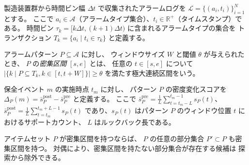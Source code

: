 
\begin{definition}[アラームトランザクション]
製造装置群から時間ビン幅 $\Delta t$ で収集されたアラームログを
$\mathcal{L} = \{(a_i, t_i)\}_{i=1}^{N}$ とする。
ここで $a_i \in \mathcal{A}$（アラームタイプ集合）、$t_i \in \mathbb{R}^+$（タイムスタンプ）である。
時間ビン $\tau_k = [k\Delta t, (k+1)\Delta t)$ に含まれるアラームタイプの集合を
トランザクション $T_k = \{a_i \mid t_i \in \tau_k\}$ と定義する。
\end{definition}

\begin{definition}[アラームパターンの密集区間]
アラームパターン $P \subseteq \mathcal{A}$ に対し、
ウィンドウサイズ $W$ と閾値 $\theta$ が与えられたとき、
$P$ の\emph{密集区間} $[s, e]$ とは、
任意の $t \in [s, e]$ について
$|\{k \mid P \subseteq T_k, k \in [t, t+W]\}| \geq \theta$
を満たす極大連続区間をいう。
\end{definition}

\begin{definition}[保全イベント帰属]
保全イベント $m$ の実施時点 $t_m$ に対し、
パターン $P$ の密度変化スコアを
$\Delta_P(m) = \bar{s}_P^{\mathrm{post}} - \bar{s}_P^{\mathrm{pre}}$
と定義する。
ここで $\bar{s}_P^{\mathrm{pre}} = \frac{1}{L} \sum_{t=t_m-L}^{t_m-1} s_P(t)$、
$\bar{s}_P^{\mathrm{post}} = \frac{1}{L} \sum_{t=t_m}^{t_m+L-1} s_P(t)$
であり、$s_P(t)$ はパターン $P$ のウィンドウ位置 $t$ におけるサポートカウント、
$L$ はルックバック長である。
\end{definition}

\begin{proposition}
アイテムセット $P$ が密集区間を持つならば、
$P$ の任意の部分集合 $P' \subset P$ も密集区間を持つ。
対偶により、密集区間を持たない部分集合が存在する候補は
探索から除外できる。
\end{proposition}
